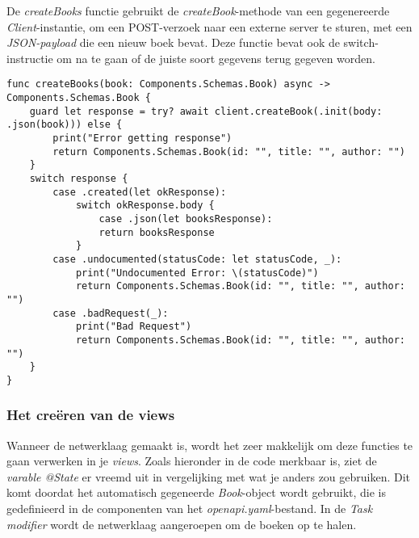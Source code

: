 De \textit{createBooks} functie gebruikt de \textit{createBook}-methode van een gegenereerde \textit{Client}-instantie, om een POST-verzoek naar een externe server te sturen, met een \textit{JSON-payload} die een nieuw boek bevat. Deze functie bevat ook de switch-instructie om na te gaan of de juiste soort gegevens terug gegeven worden. 
\begin{lstlisting}[caption=ApiService file - createBooks]
func createBooks(book: Components.Schemas.Book) async -> Components.Schemas.Book {
    guard let response = try? await client.createBook(.init(body: .json(book))) else {
        print("Error getting response")
        return Components.Schemas.Book(id: "", title: "", author: "")
    }
    switch response {
        case .created(let okResponse):
            switch okResponse.body {
                case .json(let booksResponse):
                return booksResponse
            }
        case .undocumented(statusCode: let statusCode, _):
            print("Undocumented Error: \(statusCode)")
            return Components.Schemas.Book(id: "", title: "", author: "")
        case .badRequest(_):
            print("Bad Request")
            return Components.Schemas.Book(id: "", title: "", author: "")
    }
}

\end{lstlisting}

\subsubsection{Het creëren van de views}
Wanneer de netwerklaag gemaakt is, wordt het zeer makkelijk om deze functies te gaan verwerken in je \textit{views}. Zoals hieronder in de code merkbaar is, ziet de \textit{varable @State} er vreemd uit in vergelijking met wat je anders zou gebruiken. Dit komt doordat het automatisch gegeneerde \textit{Book}-object wordt gebruikt, die is gedefinieerd in de componenten van het \textit{openapi.yaml}-bestand. In de \textit{Task modifier} wordt de netwerklaag aangeroepen om de boeken op te halen. 

